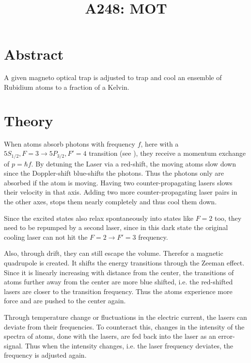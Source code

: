 \documentclass[sn-mathphys-num,icol]{sn-jnl}
\theoremstyle{thmstyleone}
\theoremstyle{thmstyletwo}
\theoremstyle{thmstylethree}
\begin{document}
\title{A248: MOT}
\author*[1]{ }
\author*[1]{ }
\maketitle

\section{Abstract}
A given magneto optical trap is adjusted to trap and cool an ensemble of Rubidium atoms to a fraction of a Kelvin.

\section{Theory}
When atoms absorb photons with frequency $f$, here with a $5S_{1/2}, F=3\rightarrow 5P_{3/2}, F'=4$ transition (see ), they receive a momentum exchange of $p=\hbar f$. By detuning the Laser via a red-shift, the moving atoms slow down since the Doppler-shift blue-shifts the photons. Thus the photons only are absorbed if the atom is moving. Having two counter-propagating lasers slows their velocity in that axis. Adding two more counter-propagating laser pairs in the other axes, stops them nearly completely and thus cool them down.

Since the excited states also relax spontaneously into states like $F=2$ too, they need to be repumped by a second laser, since in this dark state the original cooling laser can not hit the $F=2\rightarrow F'=3$ frequency.

Also, through drift, they can still escape the volume. Therefor a magnetic quadrupole is created. It shifts the energy transitions through the Zeeman effect. Since it is linearly increasing with distance from the center, the transitions of atoms further away from the center are more blue shifted, i.e. the red-shifted lasers are closer to the transition frequency. Thus the atoms experience more force and are pushed to the center again.

Through temperature change or fluctuations in the electric current, the lasers can deviate from their frequencies. To counteract this, changes in the intensity of the spectra of atoms, done with the lasers, are fed back into the laser as an error-signal. Thus when the intensity changes, i.e. the laser frequency deviates, the frequency is adjusted again.
\end{document}
